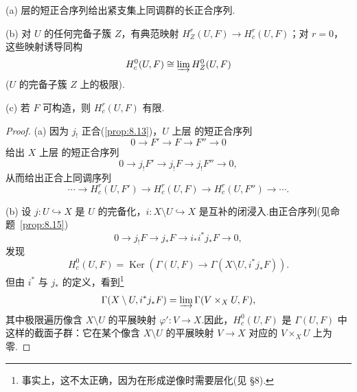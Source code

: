 \begin{proposition}\label{prop:18.3}
(a) 层的短正合序列给出紧支集上同调群的长正合序列.

(b) 对 $U$ 的任何完备子簇 $Z$，有典范映射 $H^{r}_{Z}(U, F) \to H^{r}_{c}(U, F)$；对 $r = 0$，这些映射诱导同构
\[
H^{0}_{c}(U, F) \cong \varinjlim H^{0}_{Z}(U, F)
\]
($U$ 的完备子簇 $Z$ 上的极限).

(c) 若 $F$ 可构造，则 $H^{r}_{c}(U, F)$ 有限.
\end{proposition}

\begin{proof}
(a) 因为 $j_{!}$ 正合(\ref{prop:8.13})，$U$ 上层 的短正合序列
\[
0 \to F' \to F \to F'' \to 0
\]
给出 $X$ 上层 的短正合序列
\[
0 \to j_{!}F' \to j_{!}F \to j_{!}F'' \to 0,
\]
从而给出正合上同调序列
\[
\cdots \to H^{r}_{c}(U, F') \to H^{r}_{c}(U, F) \to H^{r}_{c}(U, F'') \to \cdots.
\]

(b) 设 $j \colon U \hookrightarrow X$ 是 $U$ 的完备化，$i \colon X \setminus U \hookrightarrow X$ 是互补的闭浸入.由正合序列(见命题~\ref{prop:8.15})
\[
0 \to j_{!}F \to j_{*}F \to i_{*}i^{*}j_{*}F \to 0,
\]
发现
\[
H^{0}_{c}(U, F) = \operatorname{Ker}(\Gamma(U, F) \to \Gamma(X \setminus U, i^{*}j_{*}F)).
\]
但由 $i^{*}$ 与 $j_{*}$ 的定义，看到\footnote{事实上，这不太正确，因为在形成逆像时需要层化(见 \S 8).}
\[
\Gamma(X \setminus U, i^{*}j_{*}F) = \varinjlim \Gamma(V \times_{X} U, F),
\]
其中极限遍历像含 $X \setminus U$ 的平展映射 $\varphi' \colon V \to X$.因此，$H^{0}_{c}(U, F)$ 是 $\Gamma(U, F)$ 中这样的截面子群：它在某个像含 $X \setminus U$ 的平展映射 $V \to X$ 对应的 $V \times_{X} U$ 上为零.


\end{proof}
